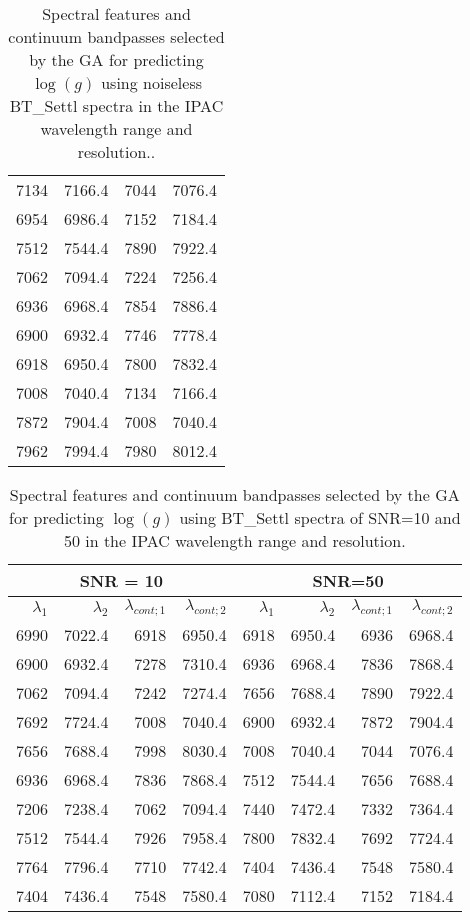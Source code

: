 \begin{appendix}
\begin{table}
\begin{center}
\begin{tabular}{rrrr}
7134 & 7166.4 &	7044 & 7076.4 \\
6954 & 6986.4 &	7152 & 7184.4 \\
7512 & 7544.4 &	7890 & 7922.4 \\
7062 & 7094.4 &	7224 & 7256.4 \\
6936 & 6968.4 &	7854 & 7886.4 \\
6900 & 6932.4 &	7746 & 7778.4 \\
6918 & 6950.4 &	7800 & 7832.4 \\
7008 & 7040.4 &	7134 & 7166.4 \\
7872 & 7904.4 &	7008 & 7040.4 \\
7962 & 7994.4 &	7980 & 8012.4 \\

\hline
\end{tabular}
\caption {Spectral features and continuum bandpasses selected by the
  GA for predicting $\log(g)$ using noiseless BT\_Settl spectra in the
  IPAC wavelength range and resolution..} \label{tab:ipac-logg-noiseless}
\end{center}
\end{table}

\begin{table*}
\begin{center}
\begin{tabular}{rrrr | rrrr}
  \hline
 \multicolumn{4}{c}{SNR = 10} &  \multicolumn{4}{c}{SNR=50} \\
  \hline
$\lambda_1$ & $\lambda_2$ & $\lambda_{cont;1}$ & $\lambda_{cont;2} $ & $\lambda_1$ & $\lambda_2$ & $\lambda_{cont;1}$ & $\lambda_{cont;2} $ \\ 
  \hline

6990 & 7022.4 &	6918 & 6950.4 & 6918 & 6950.4 & 6936 & 6968.4  \\
6900 & 6932.4 &	7278 & 7310.4 & 6936 & 6968.4 & 7836 & 7868.4  \\
7062 & 7094.4 &	7242 & 7274.4 & 7656 & 7688.4 & 7890 & 7922.4  \\
7692 & 7724.4 &	7008 & 7040.4 & 6900 & 6932.4 & 7872 & 7904.4  \\
7656 & 7688.4 &	7998 & 8030.4 & 7008 & 7040.4 & 7044 & 7076.4  \\
6936 & 6968.4 &	7836 & 7868.4 & 7512 & 7544.4 & 7656 & 7688.4  \\
7206 & 7238.4 &	7062 & 7094.4 & 7440 & 7472.4 & 7332 & 7364.4  \\
7512 & 7544.4 &	7926 & 7958.4 & 7800 & 7832.4 & 7692 & 7724.4  \\
7764 & 7796.4 &	7710 & 7742.4 & 7404 & 7436.4 & 7548 & 7580.4  \\
7404 & 7436.4 &	7548 & 7580.4 & 7080 & 7112.4 & 7152 & 7184.4  \\
   \hline
\end{tabular}
\caption {Spectral features and continuum bandpasses selected by the
  GA for predicting $\log(g)$ using BT\_Settl spectra of SNR=10 and 50
  in the IPAC wavelength range and
  resolution.} \label{tab:ipac-logg-noisy}
\end{center}
\end{table*}


\end{appendix}
